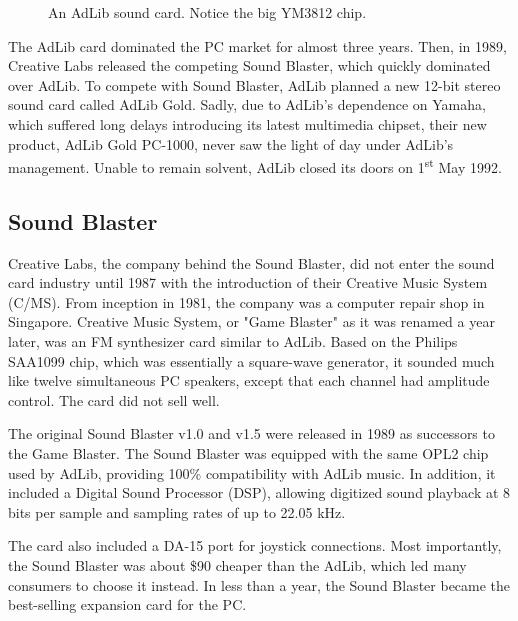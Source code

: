 \documentclass[book.tex]{subfiles}
\begin{document}
\par
  \begin{figure}[H] 
    \centering 
    \caption{An AdLib sound card. Notice the big YM3812 chip.}
  \end{figure}

\par
The AdLib card dominated the PC market for almost three years. Then, in 1989, Creative Labs released the competing Sound Blaster, which quickly dominated over AdLib. To compete with Sound Blaster, AdLib planned a new 12-bit stereo sound card called AdLib Gold. Sadly, due to AdLib's dependence on Yamaha, which suffered long delays introducing its latest multimedia chipset, their new product, AdLib Gold PC-1000, never saw the light of day under AdLib's management. Unable to remain solvent, AdLib closed its doors on 1\textsuperscript{st} May 1992.\\


\subsection{Sound Blaster}
Creative Labs, the company behind the Sound Blaster, did not enter the sound card industry until 1987 with the introduction of their Creative Music System (C/MS). From inception in 1981, the company was a computer repair shop in Singapore. Creative Music System, or "Game Blaster" as it was renamed a year later, was an FM synthesizer card similar to AdLib. Based on the Philips SAA1099 chip, which was essentially a square-wave generator, it sounded much like twelve simultaneous PC speakers, except that each channel had amplitude control. The card did not sell well.\\
  
\par
The original Sound Blaster v1.0 and v1.5 were released in 1989 as successors to the Game Blaster. The Sound Blaster was equipped with the same OPL2 chip used by AdLib, providing 100\% compatibility with AdLib music. In addition, it included a Digital Sound Processor (DSP), allowing digitized sound playback at 8 bits per sample and sampling rates of up to 22.05 kHz.\\

\par
The card also included a DA-15 port for joystick connections. Most importantly, the Sound Blaster was about \$90 cheaper than the AdLib, which led many consumers to choose it instead. In less than a year, the Sound Blaster became the best-selling expansion card for the PC.\\
\end{document}
